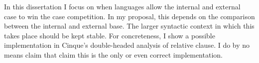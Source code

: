 In this dissertation I focus on when languages allow the internal and external case to win the case competition. In my proposal, this depends on the comparison between the internal and external base. The larger syntactic context in which this takes place should be kept stable. For concreteness, I show a possible implementation in Cinque's double-headed analysis of relative clause. I do by no means claim that claim this is the only or even correct implementation.



%
%
%
%

